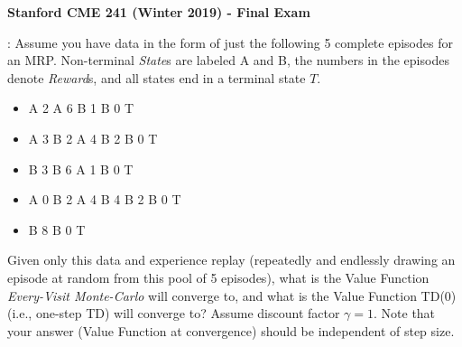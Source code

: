 \documentclass[12pt]{exam}
\begin{document}
\begin{center}
{\large {\bf Stanford CME 241 (Winter 2019) - Final Exam}}
\end{center}
\vspace{5mm}
 
\begin{questions}
: Assume you have data in the form of just the following 5 complete episodes for an MRP. Non-terminal {\em State}s are labeled A and B, the numbers in the episodes denote {\em Reward}s, and all states end in a terminal state $T$.
\begin{itemize}
\item A 2 A 6 B 1 B 0 T
\item A 3 B 2 A 4 B 2 B 0 T
\item B 3 B 6 A 1 B 0 T
\item A 0 B 2 A 4 B 4 B 2 B 0 T
\item B 8 B 0 T
\end{itemize}
Given only this data and experience replay (repeatedly and endlessly drawing an episode at random from this pool of 5 episodes), what is the Value Function {\em Every-Visit Monte-Carlo} will converge to, and what is the Value Function TD(0) (i.e., one-step TD) will converge to? Assume discount factor $\gamma = 1$. Note that your answer (Value Function at convergence) should be independent of step size.
\vspace{10mm}


\end{questions}
\end{document}
